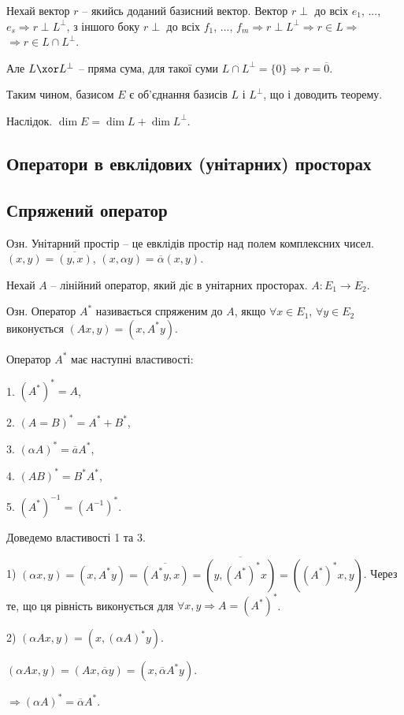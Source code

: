 Нехай вектор $r$ -- якийсь доданий базисний вектор. Вектор $r \perp$ до всіх
$e_1$, ..., $e_s \Rightarrow r \perp L^{\perp}$, з іншого боку $r \perp$ до всіх 
$f_1$, ..., $f_m \Rightarrow r \perp L^{\perp} \Rightarrow r \in L \Rightarrow$
$\Rightarrow r \in L \cap L^{\perp}$.

Але $L \xor L^{\perp}$ -- пряма сума, для такої суми $L \cap L^{\perp} = \{0\} \Rightarrow r = \overline{0}$.

Таким чином, базисом $E$ є об’єднання базисів $L$ і $L^{\perp}$, що і доводить теорему.

Наслідок. $\dim E =  \dim L + \dim L^{\perp}$.

\subsection{Оператори в евклідових (унітарних) просторах} %

\subsection*{Спряжений оператор}

Озн. Унітарний простір -- це евклідів простір над полем комплексних чисел.
$(x,y) = \overline{(y,x)}$, $(x,\alpha y) = \overline{\alpha}(x,y)$.

Нехай $A$ -- лінійний оператор, який діє в унітарних просторах.
$A: E_1 \rightarrow E_2$.

Озн. Оператор $A^*$ називається спряженим до $A$, якщо $\forall x \in E_1$, $\forall y \in E_2$
виконується $(A x, y) = (x, A^*y)$.

Оператор $A^*$ має наступні властивості:

1. $(A^*)^* = A$,

2. $(A = B)^* = A^* + B^*$,

3. $(\alpha A)^* = \overline{a} A^*$,

4. $(AB)^* = B^*A^*$,

5. $(A^*)^{-1} = (A^{-1})^*$.

Доведемо властивості 1 та 3.

1) $(\alpha x,y) = (x,A^* y) = \overline{(A^*y,x)} = \overline{(y,(A^*)^*x)} = ((A^*)^*x,y)$.
Через те, що ця рівність виконується для $\forall x, y \Rightarrow A = (A^*)^*$.

2) $(\alpha A x, y) = (x, (\alpha A)^* y)$.

$(\alpha A x, y) = (A x, \overline{\alpha} y) = (x, \overline{\alpha} A^* y)$.

$\Rightarrow (\alpha A)^* = \overline{\alpha} A^*$.

